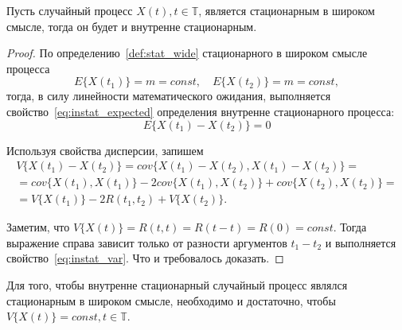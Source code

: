 \begin{Theorem}
	Пусть случайный процесс $ X(t), t \in \mathbb{T} $, является стационарным в широком смысле, тогда он будет и внутренне стационарным.
\end{Theorem}
\begin{proof}

По определению~\ref{def:stat_wide} стационарного в широком смысле процесса
\begin{equation*}
	E \{ X(t_1) \} = m = const, \quad E \{ X(t_2) \} = m = const,
\end{equation*}
тогда, в силу линейности математического ожидания, выполняется свойство~\eqref{eq:instat_expected} определения внутренне стационарного процесса:
\begin{equation*}
	E \{ X(t_1) - X(t_2) \} = 0
\end{equation*}

Используя свойства дисперсии, запишем
\begin{equation*}\begin{gathered}
	V\{X(t_1) - X(t_2)\} = cov\{X(t_1) - X(t_2), X(t_1) - X(t_2)\} = \\
	= cov\{X(t_1), X(t_1)\} - 2cov\{X(t_1), X(t_2)\} + cov\{X(t_2), X(t_2)\} = \\
	= V\{X(t_1)\} - 2R(t_1, t_2) + V\{X(t_2)\}.
\end{gathered}\end{equation*}

Заметим, что $V\{X(t)\} = R(t, t) = R(t - t) = R(0) = const$. Тогда выражение справа зависит только от разности аргументов $t_1 - t_2$ и выполняется свойство~\eqref{eq:instat_var}. Что и требовалось доказать.
\end{proof}

\begin{Remark}
	Для того, чтобы внутренне стационарный случайный процесс являлся стационарным в широком смысле, необходимо и достаточно, чтобы $V \{ X(t) \} = const, t \in \mathbb{T}$.
\end{Remark}
